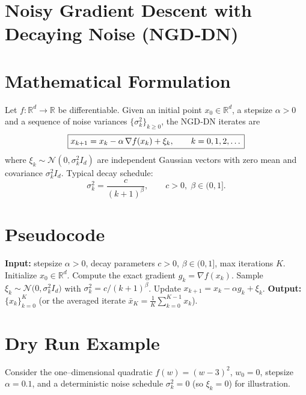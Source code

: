\documentclass[11pt]{article}
\newcommand{\R}{\mathbb{R}}
\begin{document}
\section*{Noisy Gradient Descent with Decaying Noise (NGD‑DN)}

\section*{Mathematical Formulation}
Let $f:\R^{d}\rightarrow\R$ be differentiable.  Given an initial point $x_{0}\in\R^{d}$, a stepsize $\alpha>0$ and a sequence of noise variances $\{\sigma_{k}^{2}\}_{k\ge 0}$, the NGD‑DN iterates are
\[
\boxed{%
x_{k+1}=x_{k}-\alpha\,\nabla f(x_{k})+\xi_{k},\qquad k=0,1,2,\dots
}
\]
where $\xi_{k}\sim\mathcal{N}(0,\sigma_{k}^{2}I_{d})$ are independent Gaussian vectors with zero mean and covariance $\sigma_{k}^{2}I_{d}$.  
Typical decay schedule:
\[
\sigma_{k}^{2}= \frac{c}{(k+1)^{\beta}},\qquad c>0,\;\beta\in(0,1].
\]

\section*{Pseudocode}
\begin{algorithm}[H]
\caption{NGD‑DN}
\begin{algorithmic}[1]
\STATE \textbf{Input:} stepsize $\alpha>0$, decay parameters $c>0$, $\beta\in(0,1]$, max iterations $K$.
\STATE Initialize $x_{0}\in\R^{d}$.
\STATE Compute the exact gradient $g_{k}= \nabla f(x_{k})$.
\STATE Sample $\xi_{k}\sim\mathcal{N}\!\bigl(0,\sigma_{k}^{2}I_{d}\bigr)$ with $\sigma_{k}^{2}=c/(k+1)^{\beta}$.
\STATE Update $x_{k+1}=x_{k}-\alpha g_{k}+\xi_{k}$.
\ENDFOR
\STATE \textbf{Output:} $\{x_{k}\}_{k=0}^{K}$ (or the averaged iterate $\bar x_{K}= \tfrac{1}{K}\sum_{k=0}^{K-1}x_{k}$).
\end{algorithmic}
\end{algorithm}

\section*{Dry Run Example}
Consider the one–dimensional quadratic $f(w)=(w-3)^{2}$, $w_{0}=0$, stepsize $\alpha=0.1$, and a deterministic noise schedule $\sigma_{k}^{2}=0$ (so $\xi_{k}=0$) for illustration.
\end{document}
